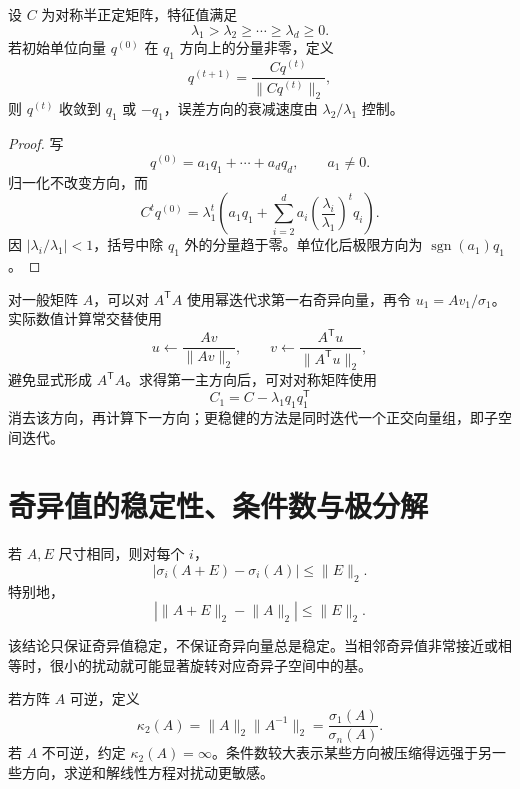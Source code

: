 \begin{theorem}[幂迭代求第一主方向]
设 $C$ 为对称半正定矩阵，特征值满足
\[
\lambda_1>\lambda_2\ge\cdots\ge\lambda_d\ge0.
\]
若初始单位向量 $q^{(0)}$ 在 $q_1$ 方向上的分量非零，定义
\[
q^{(t+1)}=\frac{Cq^{(t)}}{\lVert Cq^{(t)}\rVert_2},
\]
则 $q^{(t)}$ 收敛到 $q_1$ 或 $-q_1$，误差方向的衰减速度由 $\lambda_2/\lambda_1$ 控制。
\end{theorem}
\begin{proof}
写
\[
q^{(0)}=a_1q_1+\cdots+a_dq_d,
\qquad a_1\ne0.
\]
归一化不改变方向，而
\[
C^tq^{(0)}
=\lambda_1^t\left(a_1q_1+
\sum_{i=2}^da_i\left(\frac{\lambda_i}{\lambda_1}\right)^tq_i\right).
\]
因 $|\lambda_i/\lambda_1|<1$，括号中除 $q_1$ 外的分量趋于零。单位化后极限方向为 $\operatorname{sgn}(a_1)q_1$。
\end{proof}

对一般矩阵 $A$，可以对 $A^{\mathsf T}A$ 使用幂迭代求第一右奇异向量，再令 $u_1=Av_1/\sigma_1$。实际数值计算常交替使用
\[
u\leftarrow\frac{Av}{\lVert Av\rVert_2},
\qquad
v\leftarrow\frac{A^{\mathsf T}u}{\lVert A^{\mathsf T}u\rVert_2},
\]
避免显式形成 $A^{\mathsf T}A$。求得第一主方向后，可对对称矩阵使用
\[
C_1=C-\lambda_1q_1q_1^{\mathsf T}
\]
消去该方向，再计算下一方向；更稳健的方法是同时迭代一个正交向量组，即子空间迭代。

\section{奇异值的稳定性、条件数与极分解}

\begin{theorem}
若 $A,E$ 尺寸相同，则对每个 $i$，
\[
|\sigma_i(A+E)-\sigma_i(A)|\le\lVert E\rVert_2.
\]
特别地，
\[
|\lVert A+E\rVert_2-\lVert A\rVert_2|
\le\lVert E\rVert_2.
\]
\end{theorem}

该结论只保证奇异值稳定，不保证奇异向量总是稳定。当相邻奇异值非常接近或相等时，很小的扰动就可能显著旋转对应奇异子空间中的基。

\begin{definition}
若方阵 $A$ 可逆，定义
\[
\kappa_2(A)=\lVert A\rVert_2\lVert A^{-1}\rVert_2
=\frac{\sigma_1(A)}{\sigma_n(A)}.
\]
若 $A$ 不可逆，约定 $\kappa_2(A)=\infty$。条件数较大表示某些方向被压缩得远强于另一些方向，求逆和解线性方程对扰动更敏感。
\end{definition}

